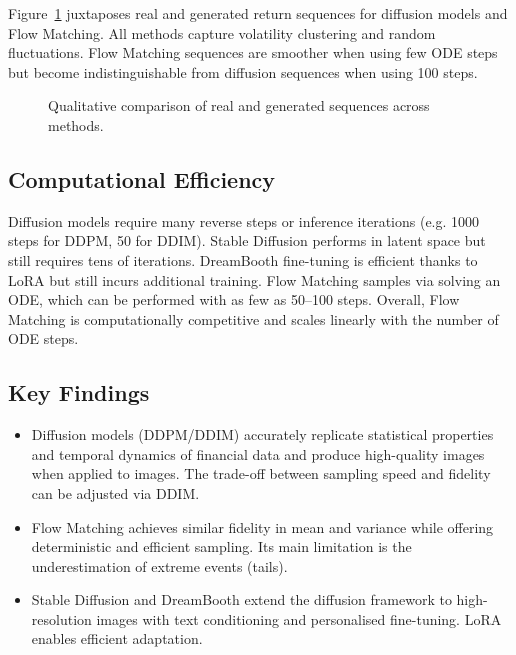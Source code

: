 Figure~\ref{fig:qual_overall} juxtaposes real and generated return
sequences for diffusion models and Flow Matching.  All methods
capture volatility clustering and random fluctuations.  Flow
Matching sequences are smoother when using few ODE steps but become
indistinguishable from diffusion sequences when using 100 steps.

\begin{figure}[H]
  \centering
  \caption{Qualitative comparison of real and generated sequences across
    methods.}
  \label{fig:qual_overall}
\end{figure}

\subsection{Computational Efficiency}

Diffusion models require many reverse steps or inference iterations
(e.g. 1000 steps for DDPM, 50 for DDIM).  Stable Diffusion performs
in latent space but still requires tens of iterations.  DreamBooth
fine-tuning is efficient thanks to LoRA but still incurs additional
training.  Flow Matching samples via solving an ODE, which can be
performed with as few as 50–100 steps.  Overall, Flow Matching is
computationally competitive and scales linearly with the number of
ODE steps.

\subsection{Key Findings}

\begin{itemize}
  \item Diffusion models (DDPM/DDIM) accurately replicate statistical
    properties and temporal dynamics of financial data and produce
    high-quality images when applied to images.  The trade-off
    between sampling speed and fidelity can be adjusted via DDIM.
  \item Flow Matching achieves similar fidelity in mean and variance
    while offering deterministic and efficient sampling.  Its main
    limitation is the underestimation of extreme events (tails).
  \item Stable Diffusion and DreamBooth extend the diffusion
    framework to high-resolution images with text conditioning and
    personalised fine-tuning.  LoRA enables efficient adaptation.
\end{itemize}

